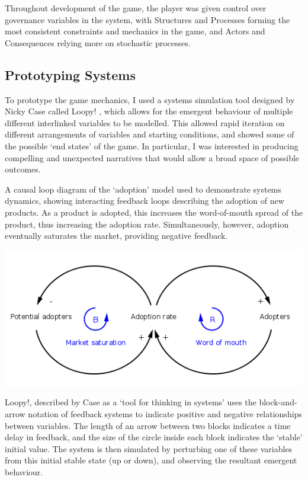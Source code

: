 \documentclass[nofonts,nols,justified,nobib]{tufte-book}
\begin{document}
Throughout development of the game, the player was given control over governance variables in the system, with Structures and Processes forming the most consistent constraints and mechanics in the game, and Actors and Consequences relying more on stochastic processes.

\subsection*{Prototyping Systems}


To prototype the game mechanics, I used a systems simulation tool designed by Nicky Case called Loopy! \cite{case_loopy!_2017}, which allows for the emergent behaviour of multiple different interlinked variables to be modelled. This allowed rapid iteration on different arrangements of variables and starting conditions, and showed some of the possible `end states' of the game. In particular, I was interested in producing compelling and unexpected narratives that would allow a broad space of possible outcomes.

\begin{marginfigure}
\caption{A causal loop diagram of the `adoption' model used to demonstrate systems dynamics, showing interacting feedback loops describing the adoption of new products. As a product is adopted, this increases the word-of-mouth spread of the product, thus increasing the adoption rate. Simultaneously, however, adoption eventually saturates the market, providing negative feedback. \cite{blleininger_english_2010}}
  \includegraphics[width=1\linewidth]{img/3/adoption.png}
  \label{contamination}
\end{marginfigure}

Loopy!, described by Case as a `tool for thinking in systems' uses the block-and-arrow notation of feedback systems to indicate positive and negative relationships between variables. The length of an arrow between two blocks indicates a time delay in feedback, and the size of the circle inside each block indicates the `stable' initial value. The system is then simulated by perturbing one of these variables from this initial stable state (up or down), and observing the resultant emergent behaviour.
\end{document}
